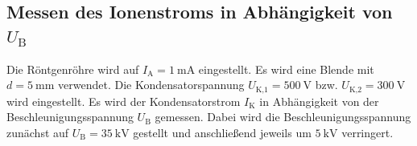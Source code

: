\subsection{Messen des Ionenstroms in Abhängigkeit von $U_\text{B}$}
Die Röntgenröhre wird auf $I_\text{A} = \SI{1}{\milli\ampere}$
eingestellt. Es wird eine Blende mit $d = \SI{5}{\milli\meter}$
verwendet. Die Kondensatorspannung $U_\text{K,1} = \SI{500}{\volt}$
bzw. $U_\text{K,2} = \SI{300}{\volt}$ wird eingestellt.
\newline
Es wird der Kondensatorstrom $I_\text{K}$ in Abhängigkeit von
der Beschleunigungsspannung $U_\text{B}$ gemessen.
Dabei wird die Beschleunigungsspannung zunächst auf
$U_\text{B} = \SI{35}{\kilo\volt}$ gestellt und anschließend
jeweils um $\SI{5}{\kilo\volt}$ verringert.